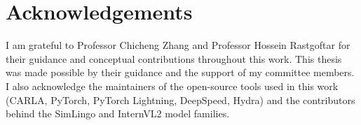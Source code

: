 \chapter*{Acknowledgements}

I am grateful to Professor Chicheng Zhang and Professor Hossein Rastgoftar for their guidance and conceptual contributions throughout this work. This thesis was made possible by their guidance and the support of my committee members. I also acknowledge the maintainers of the open-source tools used in this work (CARLA, PyTorch, PyTorch Lightning, DeepSpeed, Hydra) and the contributors behind the SimLingo and InternVL2 model families.

